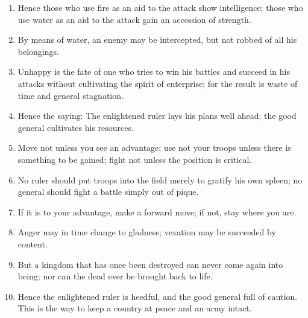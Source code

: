 \begin{enumerate}
  \item Hence those who use fire as an aid to the attack show
    intelligence; those who use water as an aid to the attack gain an
    accession of strength.

  \item By means of water, an enemy may be intercepted, but not robbed
    of all his belongings.

  \item Unhappy is the fate of one who tries to win his battles and
    succeed in his attacks without cultivating the spirit of
    enterprise; for the result is waste of time and general
    stagnation.

  \item Hence the saying: The enlightened ruler lays his plans well
    ahead; the good general cultivates his resources.

  \item Move not unless you see an advantage; use not your troops
    unless there is something to be gained; fight not unless the
    position is critical.

  \item No ruler should put troops into the field merely to gratify
    his own spleen; no general should fight a battle simply out of
    pique.

  \item If it is to your advantage, make a forward move; if not, stay
    where you are.

  \item Anger may in time change to gladness; vexation may be
    succeeded by content.

  \item But a kingdom that has once been destroyed can never come
    again into being; nor can the dead ever be brought back to life.

  \item Hence the enlightened ruler is heedful, and the good general
    full of caution. This is the way to keep a country at peace and an
    army intact.

  \end{enumerate}

